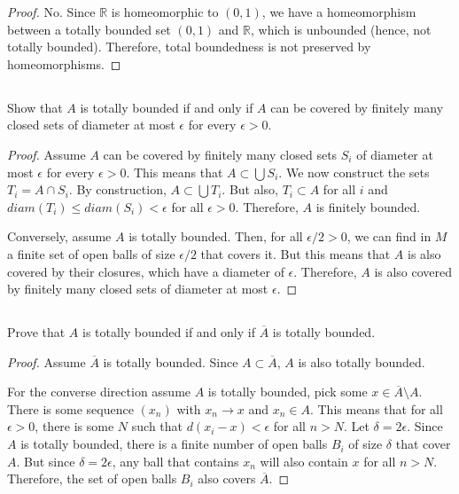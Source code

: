 \begin{proof}
No. Since $\mathbb{R}$ is homeomorphic to $(0,1)$, we have a homeomorphism between a totally bounded set $(0,1)$ and $\mathbb{R}$, which is unbounded (hence, not totally bounded). Therefore, total boundedness is not preserved by homeomorphisms.
\end{proof}
\newpage
\subsection{} Show that $A$ is totally bounded if and only if $A$ can be covered by finitely many closed sets of diameter at most $\epsilon$ for every $\epsilon > 0$. 

\begin{proof}
Assume $A$ can be covered by finitely many closed sets $S_i$ of diameter at most $\epsilon$ for every $\epsilon > 0$. This means that $A \subset \bigcup S_i$. We now construct the sets $T_i = A \cap S_i$. By construction, $A \subset \bigcup T_i$. But also, $T_i \subset A$ for all $i$ and $diam(T_i) \leq diam(S_i) < \epsilon$ for all $\epsilon > 0$. Therefore, $A$ is finitely bounded.

Conversely, assume $A$ is totally bounded. Then, for all $\epsilon/2 > 0$, we can find in $M$ a finite set of open balls of size $\epsilon/2$ that covers it. But this means that $A$ is also covered by their closures, which have a diameter of $\epsilon$. Therefore, $A$ is also covered by finitely many closed sets of diameter at most $\epsilon$.

\end{proof}

\subsection{} Prove that $A$ is totally bounded if and only if $\overline{A}$ is totally bounded. 

\begin{proof}
Assume $\overline{A}$ is totally bounded. Since $A \subset \overline{A}$, $A$ is also totally bounded.


For the converse direction assume $A$ is totally bounded, pick some $x \in \overline{A} \setminus A$. There is some sequence $(x_n)$ with $x_n \rightarrow x$ and $x_n \in A$. This means that for all $\epsilon > 0$, there is some $N$ such that $d(x_i - x) < \epsilon$ for all $n>N$. Let $\delta = 2\epsilon$. Since $A$ is totally bounded, there is a finite number of open balls $B_i$ of size $\delta$ that cover $A$. But since $\delta = 2\epsilon$, any ball that contains $x_n$ will also contain $x$ for all $n > N$. Therefore, the set of open balls $B_i$ also covers $\overline{A}$.

\end{proof}

